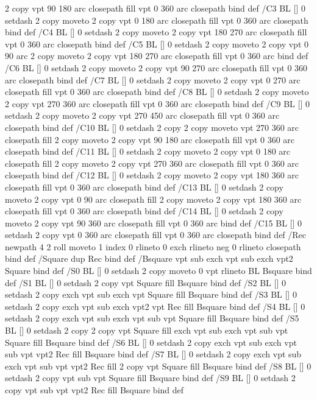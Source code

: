 {{{	2 copy vpt 90 180 arc closepath fill
	vpt 0 360 arc closepath} bind def
/C3 {BL [] 0 setdash 2 copy moveto
	2 copy vpt 0 180 arc closepath fill
	vpt 0 360 arc closepath} bind def
/C4 {BL [] 0 setdash 2 copy moveto
	2 copy vpt 180 270 arc closepath fill
	vpt 0 360 arc closepath} bind def
/C5 {BL [] 0 setdash 2 copy moveto
	2 copy vpt 0 90 arc
	2 copy moveto
	2 copy vpt 180 270 arc closepath fill
	vpt 0 360 arc} bind def
/C6 {BL [] 0 setdash 2 copy moveto
	2 copy vpt 90 270 arc closepath fill
	vpt 0 360 arc closepath} bind def
/C7 {BL [] 0 setdash 2 copy moveto
	2 copy vpt 0 270 arc closepath fill
	vpt 0 360 arc closepath} bind def
/C8 {BL [] 0 setdash 2 copy moveto
	2 copy vpt 270 360 arc closepath fill
	vpt 0 360 arc closepath} bind def
/C9 {BL [] 0 setdash 2 copy moveto
	2 copy vpt 270 450 arc closepath fill
	vpt 0 360 arc closepath} bind def
/C10 {BL [] 0 setdash 2 copy 2 copy moveto vpt 270 360 arc closepath fill
	2 copy moveto
	2 copy vpt 90 180 arc closepath fill
	vpt 0 360 arc closepath} bind def
/C11 {BL [] 0 setdash 2 copy moveto
	2 copy vpt 0 180 arc closepath fill
	2 copy moveto
	2 copy vpt 270 360 arc closepath fill
	vpt 0 360 arc closepath} bind def
/C12 {BL [] 0 setdash 2 copy moveto
	2 copy vpt 180 360 arc closepath fill
	vpt 0 360 arc closepath} bind def
/C13 {BL [] 0 setdash 2 copy moveto
	2 copy vpt 0 90 arc closepath fill
	2 copy moveto
	2 copy vpt 180 360 arc closepath fill
	vpt 0 360 arc closepath} bind def
/C14 {BL [] 0 setdash 2 copy moveto
	2 copy vpt 90 360 arc closepath fill
	vpt 0 360 arc} bind def
/C15 {BL [] 0 setdash 2 copy vpt 0 360 arc closepath fill
	vpt 0 360 arc closepath} bind def
/Rec {newpath 4 2 roll moveto 1 index 0 rlineto 0 exch rlineto
	neg 0 rlineto closepath} bind def
/Square {dup Rec} bind def
/Bsquare {vpt sub exch vpt sub exch vpt2 Square} bind def
/S0 {BL [] 0 setdash 2 copy moveto 0 vpt rlineto BL Bsquare} bind def
/S1 {BL [] 0 setdash 2 copy vpt Square fill Bsquare} bind def
/S2 {BL [] 0 setdash 2 copy exch vpt sub exch vpt Square fill Bsquare} bind def
/S3 {BL [] 0 setdash 2 copy exch vpt sub exch vpt2 vpt Rec fill Bsquare} bind def
/S4 {BL [] 0 setdash 2 copy exch vpt sub exch vpt sub vpt Square fill Bsquare} bind def
/S5 {BL [] 0 setdash 2 copy 2 copy vpt Square fill
	exch vpt sub exch vpt sub vpt Square fill Bsquare} bind def
/S6 {BL [] 0 setdash 2 copy exch vpt sub exch vpt sub vpt vpt2 Rec fill Bsquare} bind def
/S7 {BL [] 0 setdash 2 copy exch vpt sub exch vpt sub vpt vpt2 Rec fill
	2 copy vpt Square fill Bsquare} bind def
/S8 {BL [] 0 setdash 2 copy vpt sub vpt Square fill Bsquare} bind def
/S9 {BL [] 0 setdash 2 copy vpt sub vpt vpt2 Rec fill Bsquare} bind def
}}
